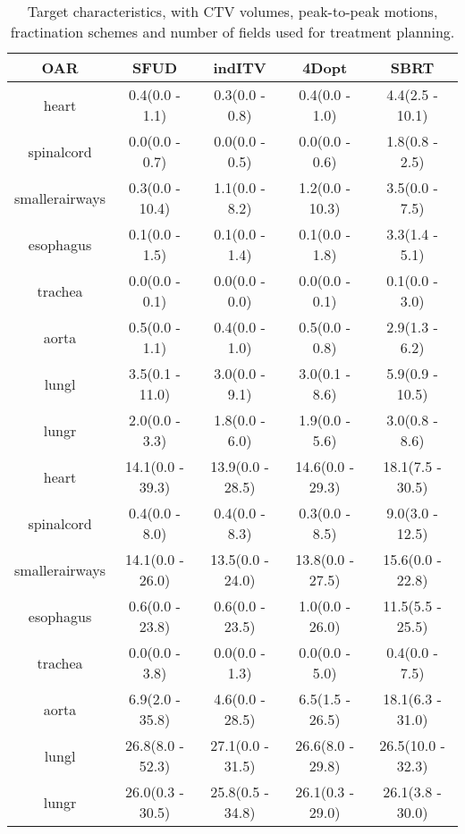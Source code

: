 \begin{table}[H]
	\centering
	\caption{Target characteristics, with CTV volumes, peak-to-peak motions, fractination schemes and number of fields used for treatment planning.}
	\begin{tabular}{c|c|c|c|c}
		\hline\hline
		OAR & SFUD & indITV & 4Dopt & SBRT \\
		\hline
heart & 0.4(0.0 - 1.1) & 0.3(0.0 - 0.8) & 0.4(0.0 - 1.0) & 4.4(2.5 - 10.1)  \\ 
spinalcord & 0.0(0.0 - 0.7) & 0.0(0.0 - 0.5) & 0.0(0.0 - 0.6) & 1.8(0.8 - 2.5)  \\ 
smallerairways & 0.3(0.0 - 10.4) & 1.1(0.0 - 8.2) & 1.2(0.0 - 10.3) & 3.5(0.0 - 7.5) \\ 
esophagus & 0.1(0.0 - 1.5) & 0.1(0.0 - 1.4) & 0.1(0.0 - 1.8) & 3.3(1.4 - 5.1)  \\ 
trachea & 0.0(0.0 - 0.1) & 0.0(0.0 - 0.0) & 0.0(0.0 - 0.1) & 0.1(0.0 - 3.0)  \\ 
aorta & 0.5(0.0 - 1.1) & 0.4(0.0 - 1.0) & 0.5(0.0 - 0.8) & 2.9(1.3 - 6.2)  \\ 
lungl & 3.5(0.1 - 11.0) & 3.0(0.0 - 9.1) & 3.0(0.1 - 8.6) & 5.9(0.9 - 10.5)  \\ 
lungr & 2.0(0.0 - 3.3) & 1.8(0.0 - 6.0) & 1.9(0.0 - 5.6) & 3.0(0.8 - 8.6)  \\ 

\hline\hline

heart & 14.1(0.0 - 39.3) & 13.9(0.0 - 28.5) & 14.6(0.0 - 29.3) & 18.1(7.5 - 30.5)\\ 
spinalcord & 0.4(0.0 - 8.0) & 0.4(0.0 - 8.3) & 0.3(0.0 - 8.5) & 9.0(3.0 - 12.5)\\ 
smallerairways & 14.1(0.0 - 26.0) & 13.5(0.0 - 24.0) & 13.8(0.0 - 27.5) & 15.6(0.0 - 22.8)\\ 
esophagus & 0.6(0.0 - 23.8) & 0.6(0.0 - 23.5) & 1.0(0.0 - 26.0) & 11.5(5.5 - 25.5)\\ 
trachea & 0.0(0.0 - 3.8) & 0.0(0.0 - 1.3) & 0.0(0.0 - 5.0) & 0.4(0.0 - 7.5)\\ 
aorta & 6.9(2.0 - 35.8) & 4.6(0.0 - 28.5) & 6.5(1.5 - 26.5) & 18.1(6.3 - 31.0)\\ 
lungl & 26.8(8.0 - 52.3) & 27.1(0.0 - 31.5) & 26.6(8.0 - 29.8) & 26.5(10.0 - 32.3)\\ 
lungr & 26.0(0.3 - 30.5) & 25.8(0.5 - 34.8) & 26.1(0.3 - 29.0) & 26.1(3.8 - 30.0)\\ 
\hline\hline

	\end{tabular}
	\label{tab:OARComplex}
\end{table}